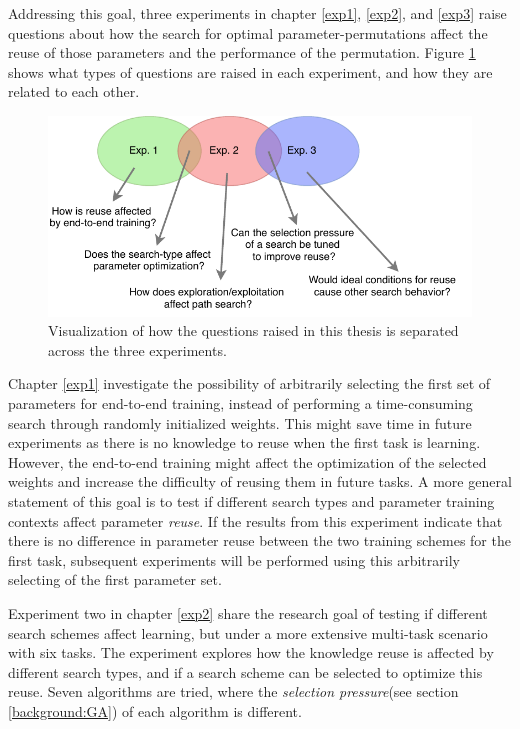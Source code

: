 Addressing this goal, three experiments in chapter \ref{exp1}, \ref{exp2}, and \ref{exp3} raise questions about how the search for optimal parameter-permutations affect the reuse of those parameters and the performance of the permutation. Figure \ref{fig:research_questions} shows what types of questions are raised in each experiment, and how they are related to each other. 

\begin{figure}[t]
    \includegraphics[width=\textwidth]{Chapters/1.Introduction/figures/All_experiments.pdf}
    \caption[Thesis questions]{Visualization of how the questions raised in this thesis is separated across the three experiments.}
    \label{fig:research_questions}
\end{figure}

Chapter \ref{exp1} investigate the possibility of arbitrarily selecting the first set of parameters for end-to-end training, instead of performing a time-consuming search through randomly initialized weights. This might save time in future experiments as there is no knowledge to reuse when the first task is learning. However, the end-to-end training might affect the optimization of the selected weights and increase the difficulty of reusing them in future tasks. A more general statement of this goal is to test if different search types and parameter training contexts affect parameter \textit{reuse}. If the results from this experiment indicate that there is no difference in parameter reuse between the two training schemes for the first task, subsequent experiments will be performed using this arbitrarily selecting of the first parameter set. 

Experiment two in chapter \ref{exp2} share the research goal of testing if different search schemes affect learning, but under a more extensive multi-task scenario with six tasks. The experiment explores how the knowledge reuse is affected by different search types, and if a search scheme can be selected to optimize this reuse. Seven algorithms are tried, where the \textit{selection pressure}(see section \ref{background:GA}) of each algorithm is different. 

